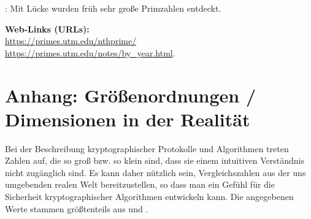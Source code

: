 \begin{refsegment}
\begin{remark}{:} Mit Lücke wurden früh sehr große Primzahlen entdeckt. \\
\end{remark}

\textbf{Web-Links (URLs):}\\
\url{https://primes.utm.edu/nthprime/} \\
\url{https://primes.utm.edu/notes/by_year.html}.



\section{Anhang: Größenordnungen / Dimensionen in der Realität}
\label{s:grosord}
Bei der Beschreibung kryptographischer Protokolle und Algorithmen
treten Zahlen auf, die so groß bzw. so klein sind, dass sie einem
intuitiven Verständnis nicht zugänglich sind. Es kann daher
nützlich sein, Vergleichszahlen aus der uns umgebenden realen
Welt bereitzustellen, so dass man ein Gefühl für die Sicherheit
kryptographischer Algorithmen entwickeln kann. Die angegebenen
Werte stammen größtenteils aus \cite{Schwenk1996} und
\cite[S.18]{Schneier1996}.  \hypertarget{grosord}{}



\end{refsegment}
